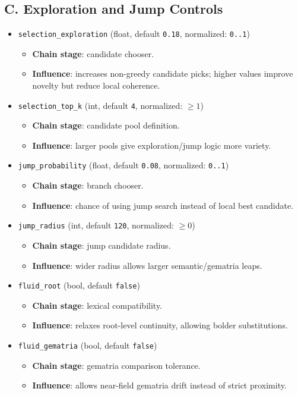 \documentclass[11pt,a4paper]{article}
\begin{document}
\subsection*{C. Exploration and Jump Controls}
\begin{itemize}
  \item \texttt{selection\_exploration} (float, default \texttt{0.18}, normalized: \texttt{0..1})
  \begin{itemize}
    \item \textbf{Chain stage}: candidate chooser.
    \item \textbf{Influence}: increases non-greedy candidate picks; higher values improve novelty but reduce local coherence.
  \end{itemize}

  \item \texttt{selection\_top\_k} (int, default \texttt{4}, normalized: $\ge 1$)
  \begin{itemize}
    \item \textbf{Chain stage}: candidate pool definition.
    \item \textbf{Influence}: larger pools give exploration/jump logic more variety.
  \end{itemize}

  \item \texttt{jump\_probability} (float, default \texttt{0.08}, normalized: \texttt{0..1})
  \begin{itemize}
    \item \textbf{Chain stage}: branch chooser.
    \item \textbf{Influence}: chance of using jump search instead of local best candidate.
  \end{itemize}

  \item \texttt{jump\_radius} (int, default \texttt{120}, normalized: $\ge 0$)
  \begin{itemize}
    \item \textbf{Chain stage}: jump candidate radius.
    \item \textbf{Influence}: wider radius allows larger semantic/gematria leaps.
  \end{itemize}

  \item \texttt{fluid\_root} (bool, default \texttt{false})
  \begin{itemize}
    \item \textbf{Chain stage}: lexical compatibility.
    \item \textbf{Influence}: relaxes root-level continuity, allowing bolder substitutions.
  \end{itemize}

  \item \texttt{fluid\_gematria} (bool, default \texttt{false})
  \begin{itemize}
    \item \textbf{Chain stage}: gematria comparison tolerance.
    \item \textbf{Influence}: allows near-field gematria drift instead of strict proximity.
  \end{itemize}
\end{itemize}
\end{document}
